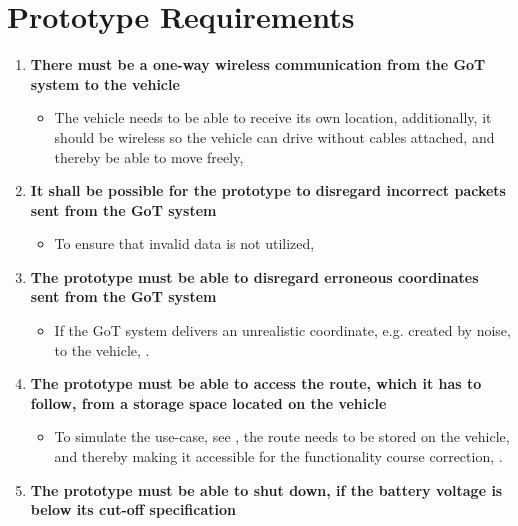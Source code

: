 \chapter{Prototype Requirements} \label{Requirements}

\begin{enumerate}
\item \textbf{There must be a one-way wireless communication from the GoT system to the vehicle}
	\begin{itemize}
	\item[] The vehicle needs to be able to receive its own location, additionally, it should be wireless so the vehicle can drive without cables attached, and thereby be able to move freely, 
	\end{itemize}
\item \textbf{It shall be possible for the prototype to disregard incorrect packets sent from the GoT system}
	\begin{itemize}
	\item[] To ensure that invalid data is not utilized, 
	\end{itemize}
	\item \textbf{The prototype must be able to disregard erroneous coordinates sent from the GoT system}
	\begin{itemize}
	\item[] If the GoT system delivers an unrealistic coordinate, e.g. created by noise, to the vehicle, .
	\end{itemize}
\item \textbf{The prototype must be able to access the route, which it has to follow, from a storage space located on the vehicle}
	\begin{itemize}
	\item[] To simulate the use-case, see , the route needs to be stored on the vehicle, and thereby making it accessible for the functionality course correction, .
	\end{itemize}
\item \textbf{The prototype must be able to shut down, if the battery voltage is below its cut-off specification}
	\begin{itemize}

\end{itemize}
\end{enumerate}
